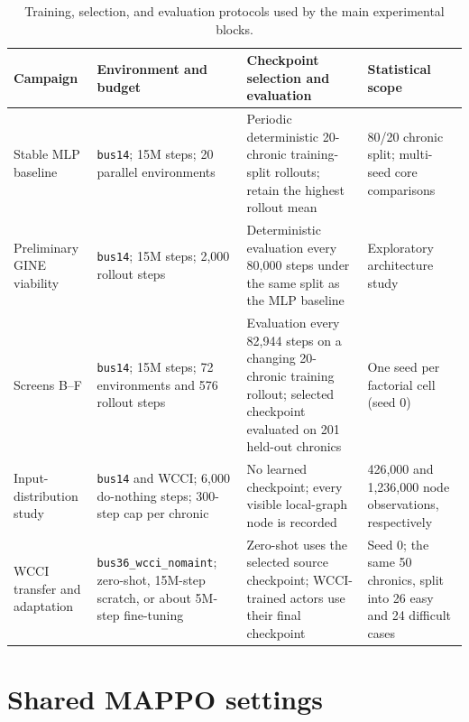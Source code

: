 {\begin{table}[H]
  \color{red}
  \centering
  \scriptsize
  \caption{Training, selection, and evaluation protocols used by the main
  experimental blocks.}
  \label{tab:reproducibility-campaigns}
  \setlength{\tabcolsep}{3pt}
  \begin{tabular}{L{0.16\textwidth}L{0.23\textwidth}L{0.33\textwidth}L{0.20\textwidth}}
    \toprule
    Campaign & Environment and budget & Checkpoint selection and evaluation & Statistical scope \\
    \midrule
    Stable MLP baseline
      & \texttt{bus14}; 15M steps; 20 parallel environments
      & Periodic deterministic 20-chronic training-split rollouts; retain the
        highest rollout mean
      & 80/20 chronic split; multi-seed core comparisons \\
    \addlinespace
    Preliminary GINE viability
      & \texttt{bus14}; 15M steps; 2{,}000 rollout steps
      & Deterministic evaluation every 80{,}000 steps under the same split as
        the MLP baseline
      & Exploratory architecture study \\
    \addlinespace
    Screens B--F
      & \texttt{bus14}; 15M steps; 72 environments and 576 rollout steps
      & Evaluation every 82{,}944 steps on a changing 20-chronic training
        rollout; selected checkpoint evaluated on 201 held-out chronics
      & One seed per factorial cell (seed 0) \\
    \addlinespace
    Input-distribution study
      & \texttt{bus14} and WCCI; 6{,}000 do-nothing steps; 300-step cap per chronic
      & No learned checkpoint; every visible local-graph node is recorded
      & 426{,}000 and 1{,}236{,}000 node observations, respectively \\
    \addlinespace
    WCCI transfer and adaptation
      & \texttt{bus36\_wcci\_nomaint}; zero-shot, 15M-step scratch, or about
        5M-step fine-tuning
      & Zero-shot uses the selected source checkpoint; WCCI-trained actors use
        their final checkpoint
      & Seed 0; the same 50 chronics, split into 26 easy and 24 difficult cases \\
    \bottomrule
  \end{tabular}
\end{table}

\section{Shared MAPPO settings}

}
